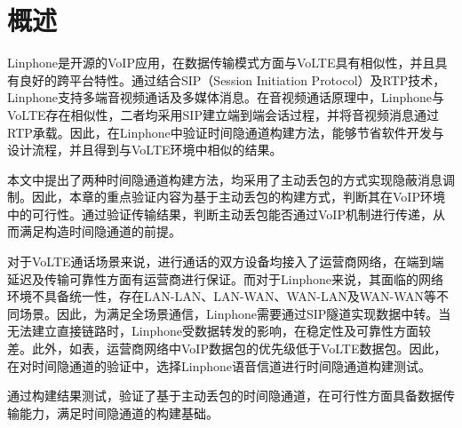 \section{概述}
\label{chap:linphone:overview}

Linphone是开源的VoIP应用，在数据传输模式方面与VoLTE具有相似性，并且具有良好的跨平台特性。通过结合SIP（Session Initiation Protocol）及RTP技术，Linphone支持多端音视频通话及多媒体消息。在音视频通话原理中，Linphone与VoLTE存在相似性，二者均采用SIP建立端到端会话过程，并将音视频消息通过RTP承载。因此，在Linphone中验证时间隐通道构建方法，能够节省软件开发与设计流程，并且得到与VoLTE环境中相似的结果。

本文中提出了两种时间隐通道构建方法，均采用了主动丢包的方式实现隐蔽消息调制。因此，本章的重点验证内容为基于主动丢包的构建方式，判断其在VoIP环境中的可行性。通过验证传输结果，判断主动丢包能否通过VoIP机制进行传递，从而满足构造时间隐通道的前提。

对于VoLTE通话场景来说，进行通话的双方设备均接入了运营商网络，在端到端延迟及传输可靠性方面有运营商进行保证。而对于Linphone来说，其面临的网络环境不具备统一性，存在LAN-LAN、LAN-WAN、WAN-LAN及WAN-WAN等不同场景。因此，为满足全场景通信，Linphone需要通过SIP隧道实现数据中转。当无法建立直接链路时，Linphone受数据转发的影响，在稳定性及可靠性方面较差。此外，如表，运营商网络中VoIP数据包的优先级低于VoLTE数据包。因此，在对时间隐通道的验证中，选择Linphone语音信道进行时间隐通道构建测试。

通过构建结果测试，验证了基于主动丢包的时间隐通道，在可行性方面具备数据传输能力，满足时间隐通道的构建基础。